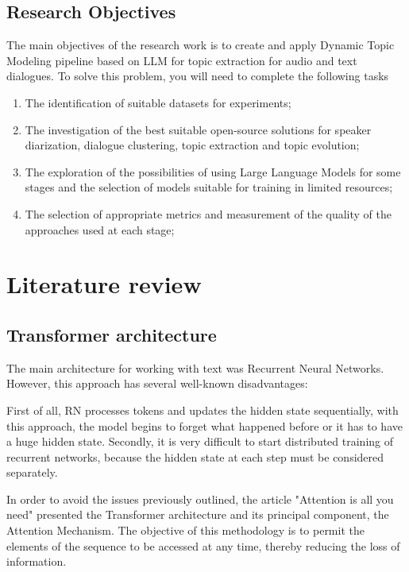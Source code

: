 \documentclass[PMI,VKR]{HSEUniversity}
\begin{document}
\section{Research Objectives}

The main objectives of the research work is to create and apply Dynamic Topic Modeling pipeline based on LLM for topic extraction for audio and text dialogues. 
To solve this problem, you will need to complete the following tasks 
\begin{enumerate}
    \item The identification of suitable datasets for experiments;
    \item The investigation of the best suitable open-source solutions for speaker diarization, dialogue clustering, topic extraction and topic evolution;
    \item The exploration of the possibilities of using Large Language Models for some stages and the selection of models suitable for training in limited resources;
    \item The selection of appropriate metrics and measurement of the quality of the approaches used at each stage;
\end{enumerate}

    
\chapter{Literature review}

\section{Transformer architecture}

The main architecture for working with text was Recurrent Neural Networks. However, this approach has several well-known disadvantages:

First of all, RN processes tokens and updates the hidden state sequentially, with this approach, the model begins to forget what happened before or it has to have a huge hidden state.
Secondly, it is very difficult to start distributed training of recurrent networks, because the hidden state at each step must be considered separately.

In order to avoid the issues previously outlined, the article "Attention is all you need" \cite{attention:2017} presented the Transformer architecture and its principal component, 
the Attention Mechanism. The objective of this methodology is to permit the elements of the sequence to be accessed at any time, thereby reducing the loss of information.
\end{document}
